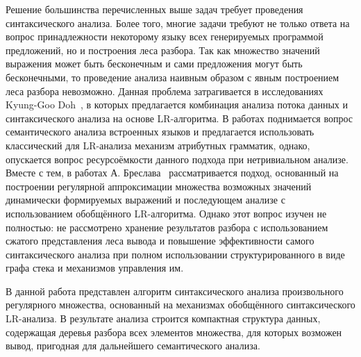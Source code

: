 Решение большинства перечисленных выше задач требует проведения синтаксического анализа. Более того, многие задачи требуют не только ответа на вопрос принадлежности некоторому языку всех генерируемых 
программой предложений, но и построения леса разбора. Так как множество значений выражения может быть бесконечным и сами предложения могут быть бесконечными, то проведение анализа наивным образом с явным 
построением леса разбора невозможно. Данная проблема затрагивается в исследованиях Kyung-Goo Doh~\cite{AbstrParsing, LRAbstrParsing, LRAbstrParsingSema}, в которых предлагается комбинация анализа потока данных и синтаксического анализа на основе LR-алгоритма. 
В работах поднимается вопрос семантического анализа встроенных языков и предлагается использовать классический для LR-анализа механизм атрибутных грамматик, однако, опускается вопрос ресурсоёмкости данного 
подхода при нетривиальном анализе. Вместе с тем, в работах А. Бреслава~\cite{Alvor1, Alvor2} рассматривается подход, основанный на построении регулярной аппроксимации множества возможных значений динамически формируемых 
выражений и последующем анализе с использованием обобщённого LR-алгоритма. Однако этот вопрос изучен не полностью: не рассмотрено хранение результатов разбора с использованием сжатого представления леса 
вывода и повышение эффективности самого синтаксического анализа при полном использовании структурированного в виде графа стека и механизмов управления им.

В данной работа представлен алгоритм синтаксического анализа произвольного регулярного множества, основанный на механизмах обобщённого синтаксического LR-анализа. В результате анализа строится компактная 
структура данных, содержащая деревья разбора всех элементов множества, для которых возможен вывод, пригодная для дальнейшего семантического анализа.